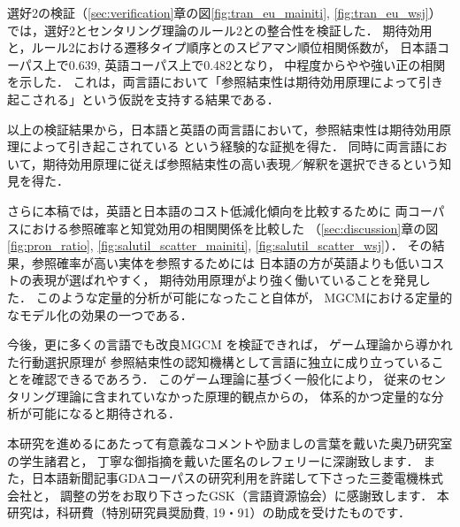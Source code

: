 \documentclass[japanese]{jnlp_1.3e}
\begin{document}
選好2の検証（\ref{sec:verification}章の図\ref{fig:tran_eu_mainiti}, \ref{fig:tran_eu_wsj}）では，選好2とセンタリング理論のルール2との整合性を検証した．
期待効用と，ルール2における遷移タイプ順序とのスピアマン順位相関係数が，
日本語コーパス上で0.639, 英語コーパス上で0.482となり，
中程度からやや強い正の相関を示した．
これは，両言語において「参照結束性は期待効用原理によって引き起こされる」という仮説を支持する結果である．

以上の検証結果から，日本語と英語の両言語において，参照結束性は期待効用原理によって引き起こされている
という経験的な証拠を得た．
同時に両言語において，期待効用原理に従えば参照結束性の高い表現／解釈を選択できるという知見を得た．





さらに本稿では，英語と日本語のコスト低減化傾向を比較するために
両コーパスにおける参照確率と知覚効用の相関関係を比較した 
（\ref{sec:discussion}章の図\ref{fig:pron_ratio}, \ref{fig:salutil_scatter_mainiti}, \ref{fig:salutil_scatter_wsj}）．
その結果，参照確率が高い実体を参照するためには
日本語の方が英語よりも低いコストの表現が選ばれやすく，
期待効用原理がより強く働いていることを発見した．
このような定量的分析が可能になったこと自体が，
MGCMにおける定量的なモデル化の効果の一つである．


今後，更に多くの言語でも改良MGCM を検証できれば，
ゲーム理論から導かれた行動選択原理が
参照結束性の認知機構として言語に独立に成り立っていることを確認できるであろう．
このゲーム理論に基づく一般化により，
従来のセンタリング理論に含まれていなかった原理的観点からの，
体系的かつ定量的な分析が可能になると期待される．






\acknowledgment

本研究を進めるにあたって有意義なコメントや励ましの言葉を戴いた奥乃研究室の学生諸君と，
丁寧な御指摘を戴いた匿名のレフェリーに深謝致します．
また，日本語新聞記事GDAコーパスの研究利用を許諾して下さった三菱電機株式会社と，
調整の労をお取り下さったGSK（言語資源協会）に感謝致します．
本研究は，科研費（特別研究員奨励費, 19・91）の助成を受けたものです．
\end{document}
